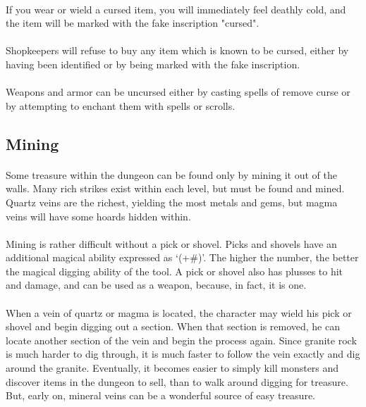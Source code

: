 \paragraph{}If you wear or wield a cursed item, you will immediately
feel deathly cold, and the item will be marked with the fake inscription
"cursed".

\paragraph{}Shopkeepers will refuse to buy any item which is known to be
cursed, either by having been identified or by being marked with the
fake inscription.

\paragraph{}Weapons and armor can be uncursed either by casting spells of
remove curse or by attempting to enchant them with spells or scrolls.

\subsection{Mining}
\paragraph{}Some treasure within the dungeon can be found only by mining
it out of the walls. Many rich strikes exist within each level, but must
be found and mined. Quartz veins are the richest, yielding the most
metals and gems, but magma veins will have some hoards hidden within.

\paragraph{}Mining is rather difficult without a pick or shovel. Picks
and shovels have an additional magical ability expressed as `(+\#)'. The
higher the number, the better the magical digging ability of the tool. A
pick or shovel also has plusses to hit and damage, and can be used as a
weapon, because, in fact, it is one.

\paragraph{}When a vein of quartz or magma is located, the character may
wield his pick or shovel and begin digging out a section. When that
section is removed, he can locate another section of the vein and begin
the process again. Since granite rock is much harder to dig through, it
is much faster to follow the vein exactly and dig around the granite.
Eventually, it becomes easier to simply kill monsters and discover items
in the dungeon to sell, than to walk around digging for treasure. But,
early on, mineral veins can be a wonderful source of easy treasure.

